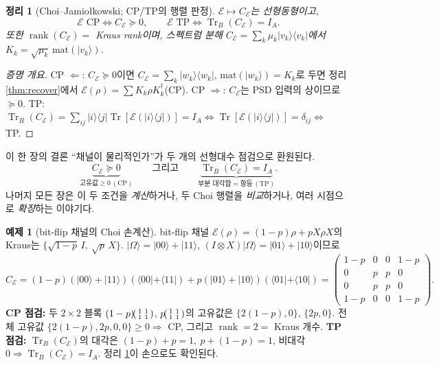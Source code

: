 \documentclass[11pt,a4paper]{article}
\newcommand{\E}{\mathcal{E}}
\newcommand{\Tr}{\operatorname{Tr}}
\newcommand{\rank}{\operatorname{rank}}
\theoremstyle{definition}
\newtheorem{example}{예제}[section]
\theoremstyle{plain}
\newtheorem{theorem}{정리}[section]
\theoremstyle{remark}
\begin{document}
\begin{theorem}[Choi--Jamio{\l}kowski; CP/TP의 행렬 판정]\label{thm:cj}
$\E\mapsto C_\E$는 선형동형이고,
\[
\boxed{\ \E\text{ CP}\iff C_\E\succeq0,\qquad \E\text{ TP}\iff\Tr_B(C_\E)=I_A.\ }
\]
또한 $\rank(C_\E)=$ Kraus rank이며, 스펙트럼 분해 $C_\E=\sum_k\mu_k|v_k\rangle\langle v_k|$에서 $K_k=\sqrt{\mu_k}\,\mathrm{mat}(|v_k\rangle)$.
\end{theorem}
\begin{proof}[증명 개요]
CP $\Leftarrow$: $C_\E\succeq0$이면 $C_\E=\sum_k|w_k\rangle\langle w_k|$, $\mathrm{mat}(|w_k\rangle)=K_k$로 두면 정리 \ref{thm:recover}에서 $\E(\rho)=\sum K_k\rho K_k^\dagger$(CP). CP $\Rightarrow$: $C_\E$는 PSD 입력의 상이므로 $\succeq0$. TP: $\Tr_B(C_\E)=\sum_{ij}|i\rangle\langle j|\Tr[\E(|i\rangle\langle j|)]=I_A\iff\Tr[\E(|i\rangle\langle j|)]=\delta_{ij}\iff$ TP.
\end{proof}

\begin{mathbox}{이 한 장의 결론}
``채널이 물리적인가''가 두 개의 선형대수 점검으로 환원된다.
\[
\underbrace{C_\E\succeq0}_{\text{고유값}\ge0\,(\text{CP})}\qquad\text{그리고}\qquad\underbrace{\Tr_B(C_\E)=I_A}_{\text{부분 대각합}=\text{항등}\,(\text{TP})}.
\]
나머지 모든 장은 이 두 조건을 \emph{계산}하거나, 두 Choi 행렬을 \emph{비교}하거나, 여러 시점으로 \emph{확장}하는 이야기다.
\end{mathbox}

\begin{example}[bit-flip 채널의 Choi 손계산]\label{ex:bitflip}
bit-flip 채널 $\E(\rho)=(1-p)\rho+pX\rho X$의 Kraus는 $\{\sqrt{1-p}\,I,\ \sqrt p\,X\}$. $|\Omega\rangle=|00\rangle+|11\rangle$, $(I\otimes X)|\Omega\rangle=|01\rangle+|10\rangle$이므로
\[
C_\E=(1-p)(|00\rangle+|11\rangle)(\langle00|+\langle11|)+p(|01\rangle+|10\rangle)(\langle01|+\langle10|)
=\begin{pmatrix}1-p&0&0&1-p\\0&p&p&0\\0&p&p&0\\1-p&0&0&1-p\end{pmatrix}.
\]
\textbf{CP 점검:} 두 $2\times2$ 블록 $(1-p)\!\begin{psmallmatrix}1&1\\1&1\end{psmallmatrix}$, $p\!\begin{psmallmatrix}1&1\\1&1\end{psmallmatrix}$의 고유값은 $\{2(1-p),0\}$, $\{2p,0\}$. 전체 고유값 $\{2(1-p),2p,0,0\}\ge0\Rightarrow$ CP, 그리고 $\rank=2=$ Kraus 개수. \textbf{TP 점검:} $\Tr_B(C_\E)$의 대각은 $(1-p)+p=1,\ p+(1-p)=1$, 비대각 $0\Rightarrow\Tr_B(C_\E)=I_A$. 정리 \ref{thm:cj}이 손으로도 확인된다.
\end{example}
\end{document}
